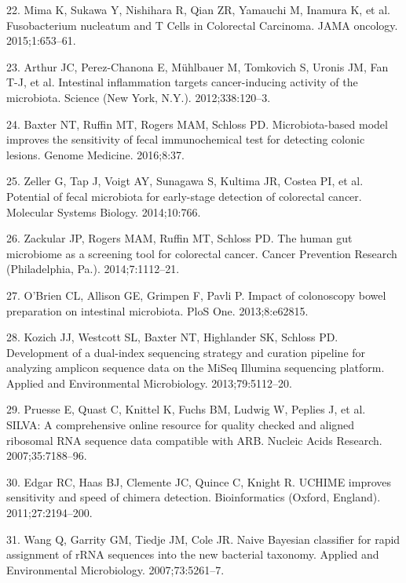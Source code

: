 \documentclass[12pt,]{article}
\begin{document}
\hypertarget{ref-mima_fusobacterium_2015}{}
22. Mima K, Sukawa Y, Nishihara R, Qian ZR, Yamauchi M, Inamura K, et
al. Fusobacterium nucleatum and T Cells in Colorectal Carcinoma. JAMA
oncology. 2015;1:653--61.

\hypertarget{ref-arthur_intestinal_2012}{}
23. Arthur JC, Perez-Chanona E, Mühlbauer M, Tomkovich S, Uronis JM, Fan
T-J, et al. Intestinal inflammation targets cancer-inducing activity of
the microbiota. Science (New York, N.Y.). 2012;338:120--3.

\hypertarget{ref-baxter_microbiota-based_2016}{}
24. Baxter NT, Ruffin MT, Rogers MAM, Schloss PD. Microbiota-based model
improves the sensitivity of fecal immunochemical test for detecting
colonic lesions. Genome Medicine. 2016;8:37.

\hypertarget{ref-zeller_potential_2014}{}
25. Zeller G, Tap J, Voigt AY, Sunagawa S, Kultima JR, Costea PI, et al.
Potential of fecal microbiota for early-stage detection of colorectal
cancer. Molecular Systems Biology. 2014;10:766.

\hypertarget{ref-zackular_human_2014}{}
26. Zackular JP, Rogers MAM, Ruffin MT, Schloss PD. The human gut
microbiome as a screening tool for colorectal cancer. Cancer Prevention
Research (Philadelphia, Pa.). 2014;7:1112--21.

\hypertarget{ref-obrien_impact_2013}{}
27. O'Brien CL, Allison GE, Grimpen F, Pavli P. Impact of colonoscopy
bowel preparation on intestinal microbiota. PloS One. 2013;8:e62815.

\hypertarget{ref-kozich_development_2013}{}
28. Kozich JJ, Westcott SL, Baxter NT, Highlander SK, Schloss PD.
Development of a dual-index sequencing strategy and curation pipeline
for analyzing amplicon sequence data on the MiSeq Illumina sequencing
platform. Applied and Environmental Microbiology. 2013;79:5112--20.

\hypertarget{ref-pruesse_silva_2007}{}
29. Pruesse E, Quast C, Knittel K, Fuchs BM, Ludwig W, Peplies J, et al.
SILVA: A comprehensive online resource for quality checked and aligned
ribosomal RNA sequence data compatible with ARB. Nucleic Acids Research.
2007;35:7188--96.

\hypertarget{ref-edgar_uchime_2011}{}
30. Edgar RC, Haas BJ, Clemente JC, Quince C, Knight R. UCHIME improves
sensitivity and speed of chimera detection. Bioinformatics (Oxford,
England). 2011;27:2194--200.

\hypertarget{ref-wang_naive_2007}{}
31. Wang Q, Garrity GM, Tiedje JM, Cole JR. Naive Bayesian classifier
for rapid assignment of rRNA sequences into the new bacterial taxonomy.
Applied and Environmental Microbiology. 2007;73:5261--7.
\end{document}
